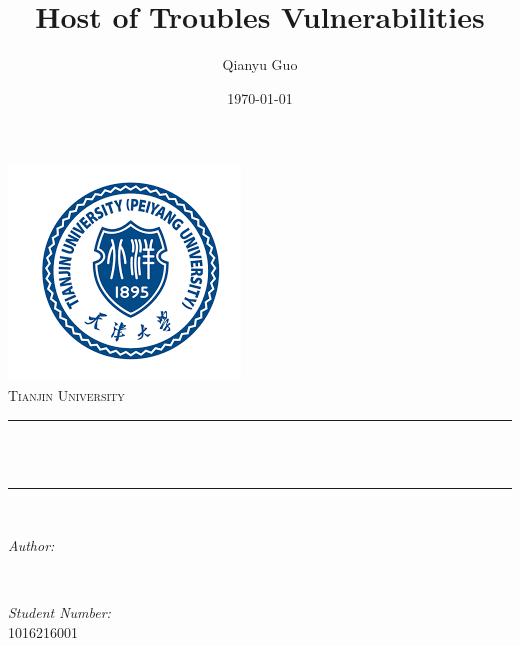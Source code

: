 \documentclass[12pt]{article}
\title{Host of Troubles Vulnerabilities}				%
\author{Qianyu Guo}										%
\date{\today}											%
\makeatletter
\let\thetitle\@title
\let\theauthor\@author
\let\thedate\@date
\makeatother
\begin{document}

\begin{titlepage}
	\centering
    \vspace*{0.5 cm}
    \includegraphics[scale = 0.65]{Peiyang.png}\\[1.0 cm]	%
    \textsc{\LARGE Tianjin University}\\[2.0 cm]	    %
	\rule{\linewidth}{0.2 mm} \\[0.4 cm]
	{ \huge \bfseries \thetitle}\\
	\rule{\linewidth}{0.2 mm} \\[1.5 cm]
	
	\begin{minipage}{0.4\textwidth}
		\begin{flushleft} \large
			\emph{Author:}\\
			\theauthor
			\end{flushleft}
			\end{minipage}~
			\begin{minipage}{0.4\textwidth}
			\begin{flushright} \large
			\emph{Student Number:} \\
			1016216001									%
		\end{flushright}
	\end{minipage}\\[2 cm]
	
	{\large \thedate}\\[2 cm]
 
	\vfill
	
\end{titlepage}

\end{document}

